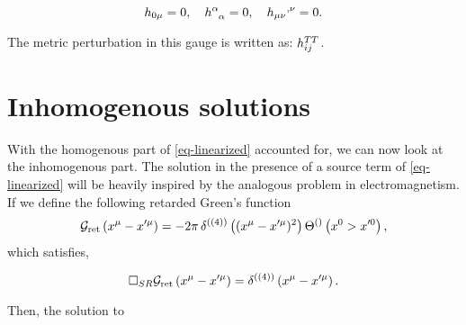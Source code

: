\documentclass[
  letterpaper,
  DIV=11,
  numbers=noendperiod,
  oneside]{scrreprt}
\begin{document}
\[
\texttip{\texttip{h}{weak metric tensor}_{0\mu}}{weak covariant metric tensor component}=0,\quad \texttip{\texttip{h}{weak metric tensor}^{\alpha}_{\phantom{\alpha}\alpha}}{weak metric tensor trace}=0, \quad \texttip{\texttip{h}{weak metric tensor}_{{\mu\nu}}}{weak covariant metric tensor component}\texttip{{}^{,\nu}}{Partial derivative}=0.
\]

The metric perturbation in this gauge is written as:
\(\mathtip{\texttip{h^{TT}}{transverse traceless weak metric tensor}_{ij}}{{\text{transverse traceless weak covariant metric tensor component: } \texttip{h^{TT}}{transverse traceless weak metric tensor}_{0\mu}=0,\quad \texttip{h^{TT}}{transverse traceless weak metric tensor}^{i}_{\phantom{i}i}=0, \quad \texttip{h^{TT}}{transverse traceless weak metric tensor}_{ij}\texttip{{}^{,j}}{Partial derivative}=0.}}\).

\hypertarget{inhomogenous-solutions}{%
\section{Inhomogenous solutions}\label{inhomogenous-solutions}}

With the homogenous part of \ref{eq-linearized} accounted for, we can
now look at the inhomogenous part. The solution in the presence of a
source term of \ref{eq-linearized} will be heavily inspired by the
analogous problem in electromagnetism. If we define the following
retarded Green's function \[
    \texttip{\mathcal{G}_{\mathrm{ret}}\left(\texttip{x^{\mu}}{contravariant mathbftor component}-\texttip{x'^{\mu}}{contravariant mathbftor component}\right)}{ret Green's function} = -2\pi\,\texttip{\delta^{((4))}\left((\texttip{x^{\mu}}{contravariant mathbftor component}-\texttip{x'^{\mu}}{contravariant mathbftor component})^2\right)}{Dirac delta function}\texttip{\Theta^{()}\left(x^0>x^{\prime 0}\right)}{Heaviside step function},
\] which satisfies,

\[
    \mathtip{\Box_{SR}}{\texttip{\texttip{\eta}{Minkoski metric tensor +---}^{{\mu\nu}}}{contravariant Minkoski metric components +---}\partial_\mu\partial_\nu}\texttip{\mathcal{G}_{\mathrm{ret}}\left(\texttip{x^{\mu}}{contravariant mathbftor component}-\texttip{x'^{\mu}}{contravariant mathbftor component}\right)}{ret Green's function} = \texttip{\delta^{((4))}\left(\texttip{x^{\mu}}{contravariant mathbftor component}-\texttip{x'^{\mu}}{contravariant mathbftor component}\right)}{Dirac delta function}.
\]

Then, the solution to
\end{document}

